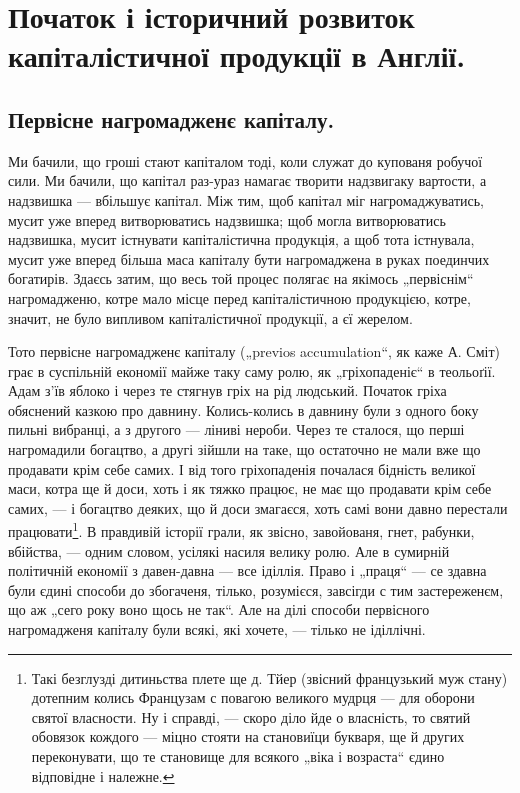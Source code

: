 \section*{Початок і історичний розвиток
капіталістичної продукції в Англії.}

\subsection{Первісне нагромадженє капіталу.}

Ми бачили, що гроші стают капіталом тоді, коли служат
до купованя робучої сили. Ми бачили, що капітал
раз-ураз намагає творити надзвигаку вартости, а надзвишка —
вбільшує капітал. Між тим, щоб капітал міг нагромаджуватись,
мусит уже вперед витворюватись надзвишка;
щоб могла витворюватись надзвишка, мусит істнувати капіталістична
продукція, а щоб тота істнувала, мусит уже
вперед більша маса капіталу бути нагромаджена в руках
поединчих богатирів. Здаєсь затим, що весь той процес
полягає на якімось „первіснім“ нагромадженю, котре мало
місце перед капіталістичною продукцією, котре, значит, не
було випливом капіталістичної продукції, а єї жерелом.

Тото первісне нагромадженє капіталу („previos accumulation“,
як каже А. Сміт) грає в суспільній економії
майже таку саму ролю, як „гріхопаденіє“ в теольоґії. Адам
з'їв яблоко і через те стягнув гріх на рід людський. Початок
гріха обяснений казкою про давнину. Колись-колись
в давнину були з одного боку пильні вибранці, а з другого —
ліниві нероби. Через те сталося, що перші нагромадили
богацтво, а другі зійшли на таке, що остаточно не мали
вже що продавати крім себе самих. І від того гріхопаденія
почалася бідність великої маси, котра ще й доси, хоть і як
тяжко працює, не має що продавати крім себе самих, —
і богацтво деяких, що й доси змагаєся, хоть самі вони
давно перестали працювати\footnote{
Такі безглузді дитиньства плете ще д. Тйер (звісний французький
муж стану) дотепним колись Французам с повагою великого мудрця —
для оборони святої власности. Ну і справді, — скоро діло йде о власність,
то святий обовязок кождого — міцно стояти на становиїци букваря,
ще й других переконувати, що те становище для всякого „віка
і возраста“ єдино відповідне і належне.
}. В правдивій історії грали, як
звісно, завойованя, гнет, рабунки, вбійства, — одним словом,
усілякі насиля велику ролю. Але в сумирній політичній
економії з давен-давна — все іділлія. Право і „праця“ — се
здавна були єдині способи до збогаченя, тілько, розумієся,
завсігди с тим застереженєм, що аж „сего року воно щось
не так“. Але на ділі способи первісного нагромадженя капіталу
були всякі, які хочете, — тілько не іділлічні.

